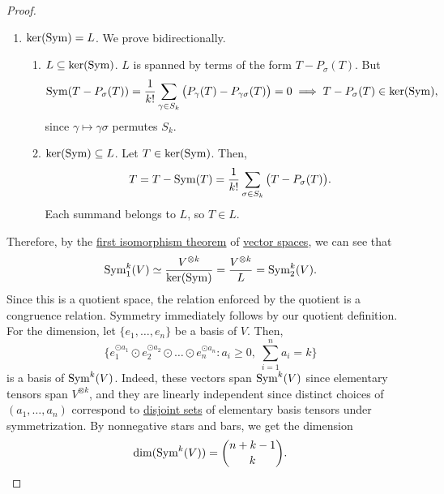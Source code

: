 \begin{proof}
\begin{enumerate}
			\item \textit{$\ker(\operatorname{Sym}) = L$}. We prove bidirectionally.
				\begin{enumerate}
					\item $L \subseteq \ker(\operatorname{Sym})$. $L$ is spanned by terms of the form $T - P_\sigma(T)$. But
						\begin{equation}
							\operatorname{Sym}(T - P_\sigma(T))
							= \frac{1}{k!} \sum_{\gamma \in S_k} \big(P_\gamma(T) - P_{\gamma \sigma}(T)\big)
							= 0
							\implies T - P_\sigma(T) \in \ker(\operatorname{Sym}),
						\end{equation}
						since $\gamma \mapsto \gamma \sigma$ permutes $S_k$.

					\item $\ker(\operatorname{Sym}) \subseteq L$. Let $T \in \ker(\operatorname{Sym})$. Then,
						\begin{equation}
							T = T - \operatorname{Sym}(T) = \frac{1}{k!} \sum_{\sigma \in S_k} \big(T - P_\sigma(T)\big).
						\end{equation}
						Each summand belongs to $L$, so $T \in L$.
				\end{enumerate}
		\end{enumerate}
		Therefore, by the \hyperref[thm:first-isomorphism-theorem]{first isomorphism theorem} of \hyperref[def:vector-space]{vector spaces}, we can see that
		\begin{equation}
			\operatorname{Sym}^k_1(V) \simeq \frac{V^{\otimes k}}{\ker(\operatorname{Sym})}
			= \frac{V^{\otimes k}}{L} = \operatorname{Sym}^k_2(V).
		\end{equation}
		Since this is a quotient space, the relation enforced by the quotient is a congruence relation. Symmetry immediately follows by our quotient definition. For the dimension, let $\{e_1, \ldots, e_n\}$ be a basis of $V$. Then,
		\begin{equation}
			\bigg\{e_1^{\odot a_1} \odot e_2^{\odot a_2} \odot \ldots \odot e_n^{\odot a_n} \colon a_i \geq 0,\; \sum_{i=1}^n a_i = k\bigg\}
		\end{equation}
		is a basis of $\operatorname{Sym}^k(V)$. Indeed, these vectors span $\operatorname{Sym}^k(V)$ since elementary tensors span $V^{\otimes k}$, and they are linearly independent since distinct choices of $(a_1,\ldots,a_n)$ correspond to \hyperref[st-def:disjoint-sets]{disjoint sets} of elementary basis tensors under symmetrization. By nonnegative stars and bars, we get the dimension
		\begin{equation}
			\dim(\operatorname{Sym}^k(V)) = \binom{n+k-1}{k}.
		\end{equation}
	\end{proof}

